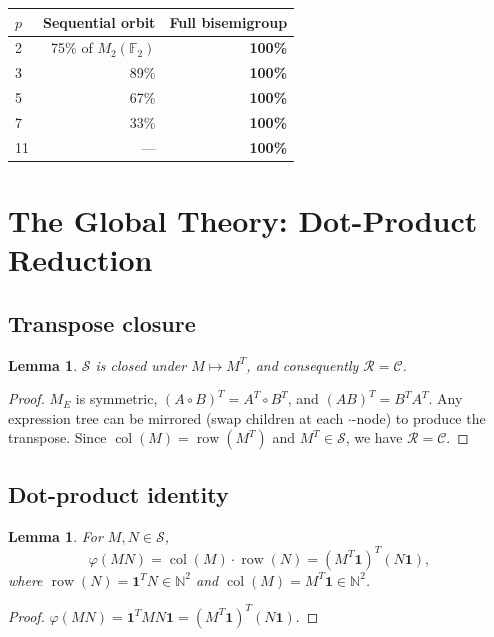 \documentclass[11pt,a4paper]{article}
\newtheorem{lemma}[theorem]{Lemma}
\theoremstyle{definition}
\theoremstyle{remark}
\newcommand{\bOne}{\mathbf{1}}
\newcommand{\FF}{\mathbb{F}}
\newcommand{\NN}{\mathbb{N}}
\newcommand{\cS}{\mathcal{S}}
\newcommand{\cR}{\mathcal{R}}
\newcommand{\cC}{\mathcal{C}}
\newcommand{\row}{\operatorname{row}}
\newcommand{\col}{\operatorname{col}}
\begin{document}
\begin{center}
\begin{tabular}{lrr}
\toprule
$p$ & Sequential orbit & Full bisemigroup \\
\midrule
2 & 75\% of $M_2(\FF_2)$ & \textbf{100\%} \\
3 & 89\% & \textbf{100\%} \\
5 & 67\% & \textbf{100\%} \\
7 & 33\% & \textbf{100\%} \\
11 & --- & \textbf{100\%} \\
\bottomrule
\end{tabular}
\end{center}

\section{The Global Theory: Dot-Product Reduction}

\subsection{Transpose closure}

\begin{lemma}
\label{lem:transpose}
$\cS$ is closed under $M \mapsto M^T$, and consequently $\cR = \cC$.
\end{lemma}

\begin{proof}
$M_E$ is symmetric, $(A \circ B)^T = A^T \circ B^T$, and $(AB)^T = B^T A^T$. Any expression tree can be mirrored (swap children at each $\cdot$-node) to produce the transpose. Since $\col(M) = \row(M^T)$ and $M^T \in \cS$, we have $\cR = \cC$.
\end{proof}

\subsection{Dot-product identity}

\begin{lemma}
\label{lem:dot}
For $M, N \in \cS$,
\[
\varphi(MN) = \col(M) \cdot \row(N) = (M^T \bOne)^T (N \bOne),
\]
where $\row(N) = \bOne^T N \in \NN^2$ and $\col(M) = M^T \bOne \in \NN^2$.
\end{lemma}

\begin{proof}
$\varphi(MN) = \bOne^T MN \bOne = (M^T \bOne)^T (N \bOne)$.
\end{proof}
\end{document}
